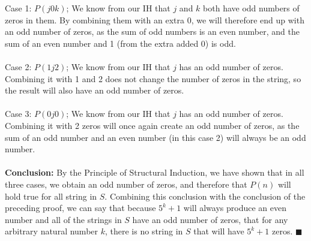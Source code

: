 \documentclass{article}
\begin{document}
\begin{enumerate}
	Case 1: $P(j0k)$; We know from our IH that $j$ and $k$ both have odd numbers of zeros in them. By combining them with an extra 0, we will therefore end up with an odd number of zeros, as the sum of odd numbers is an even number, and the sum of an even number and 1 (from the extra added 0) is odd. \\\\
	Case 2: $P(1j2)$; We know from our IH that $j$ has an odd number of zeros. Combining it with 1 and 2 does not change the number of zeros in the string, so the result will also have an odd number of zeros. \\\\
	Case 3: $P(0j0)$; We know from our IH that $j$ has an odd number of zeros. Combining it with 2 zeros will once again create an odd number of zeros, as the sum of an odd number and an even number (in this case 2) will always be an odd number. \\\\
	\textbf{Conclusion:} By the Principle of Structural Induction, we have shown that in all three cases, we obtain an odd number of zeros, and therefore that $P(n)$ will hold true for all string in $S$. Combining this conclusion with the conclusion of the preceding proof, we can say that because $5^k+1$ will always produce an even number and all of the strings in $S$ have an odd number of zeros, that for any arbitrary natural number $k$, there is no string in $S$ that will have $5^k+1$ zeros. \null\hfill $\blacksquare$ \\
	

\end{enumerate}
\end{document}
